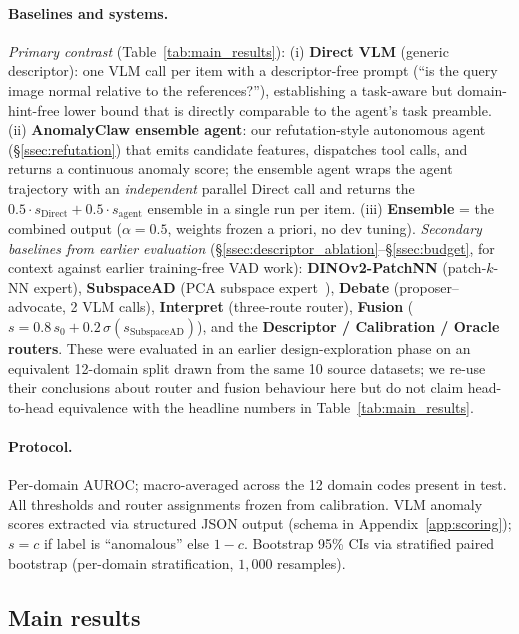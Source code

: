 \paragraph{Baselines and systems.}
\emph{Primary contrast} (Table~\ref{tab:main_results}):
(i) \textbf{Direct VLM} (generic descriptor): one VLM call per item with a descriptor-free prompt (``is the query image normal relative to the references?''), establishing a task-aware but domain-hint-free lower bound that is directly comparable to the agent's task preamble.
(ii) \textbf{AnomalyClaw ensemble agent}: our refutation-style autonomous agent (\S\ref{ssec:refutation}) that emits candidate features, dispatches tool calls, and returns a continuous anomaly score; the ensemble agent wraps the agent trajectory with an \emph{independent} parallel Direct call and returns the $0.5\!\cdot\!s_{\mathrm{Direct}}+0.5\!\cdot\!s_{\mathrm{agent}}$ ensemble in a single run per item.
(iii) \textbf{Ensemble} = the combined output ($\alpha{=}0.5$, weights frozen a priori, no dev tuning).
\emph{Secondary baselines from earlier evaluation} (\S\ref{ssec:descriptor_ablation}--\S\ref{ssec:budget}, for context against earlier training-free VAD work):
\textbf{DINOv2-PatchNN} (patch-$k$-NN expert), \textbf{SubspaceAD} (PCA subspace expert~\citep{subspacead2026}), \textbf{Debate} (proposer--advocate, 2 VLM calls), \textbf{Interpret} (three-route router), \textbf{Fusion} ($s = 0.8\,s_0 + 0.2\,\sigma(s_\mathrm{SubspaceAD})$), and the \textbf{Descriptor / Calibration / Oracle routers}. These were evaluated in an earlier design-exploration phase on an equivalent 12-domain split drawn from the same 10 source datasets; we re-use their conclusions about router and fusion behaviour here but do not claim head-to-head equivalence with the headline numbers in Table~\ref{tab:main_results}.

\paragraph{Protocol.}
Per-domain AUROC; macro-averaged across the 12 domain codes present in test. All thresholds and router assignments frozen from calibration. VLM anomaly scores extracted via structured JSON output (schema in Appendix~\ref{app:scoring}); $s = c$ if label is ``anomalous'' else $1 - c$. Bootstrap 95\% CIs via stratified paired bootstrap (per-domain stratification, $1{,}000$ resamples).

\subsection{Main results}
\label{ssec:main_results}

